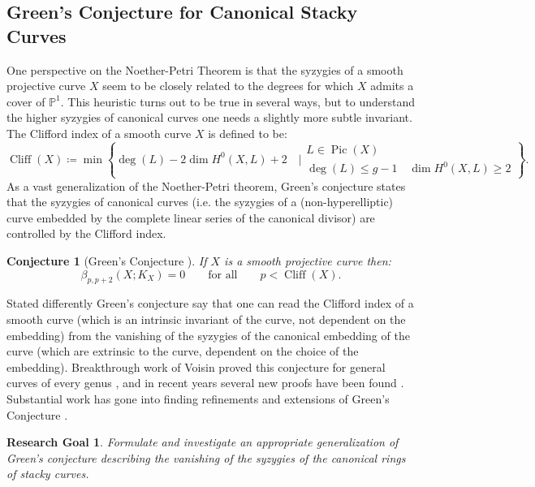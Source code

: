 \documentclass[11pt,reqno]{amsart}
\newtheorem{goal}[lemma]{Research Goal}
\newtheorem{conjecture}[lemma]{Conjecture}
\theoremstyle{remark}
\newcommand{\Pic}{\operatorname{Pic}}
\newcommand{\cliff}{\operatorname{Cliff}}
\newcommand{\PP}{\mathbb{P}}
\begin{document}
\subsection{Green's Conjecture for Canonical Stacky Curves} 

One perspective on the Noether-Petri Theorem is that the syzygies of a smooth projective curve $X$ seem to be closely related to the degrees for which $X$ admits a cover of $\PP^{1}$. This heuristic turns out to be true in several ways, but to understand the higher syzygies of canonical curves one needs a slightly more subtle invariant. The Clifford index of a smooth curve $X$ is defined to be:
 \[
\cliff(X)\coloneqq \min \left\{\deg(L) - 2 \dim H^{0}(X,L)+2 \quad \bigg| \begin{matrix} L\in \Pic(X) \\
\deg(L)\leq g-1 \quad \dim H^0(X,L)\geq2\end{matrix}\right\}.
\]
As a vast generalization of the Noether-Petri theorem, Green's conjecture states that the syzygies of canonical curves (i.e. the syzygies of a (non-hyperelliptic) curve embedded by the complete linear series of the canonical divisor) are controlled by the Clifford index.

\begin{conjecture}[Green's Conjecture \cite{green84-I}]
	If $X$ is a smooth projective curve then:
	\[
	\beta_{p,p+2}(X;K_X)=0 \quad \quad \text{for all} \quad \quad p<\cliff(X).
	\]
\end{conjecture}

Stated differently Green's conjecture say that one can read the Clifford index of a smooth curve (which is an intrinsic invariant of the curve, not dependent on the embedding) from the vanishing of the syzygies of the canonical embedding of the curve (which are extrinsic to the curve, dependent on the choice of the embedding). Breakthrough work of Voisin proved this conjecture for general curves of every genus \cite{voisin02,voisin05}, and in recent years several new proofs have been found \cite{aprodu19,kemeny21}. Substantial work has gone into finding refinements and extensions of Green's Conjecture \cite{farkasMustataPopa03,chiodoEFS13,farkasKemeny16,farkasKemeny17,deopurkar18,kemeny24}.


\begin{goal}\label{goal:stackyGreens}
Formulate and investigate an appropriate generalization of Green's conjecture describing the vanishing of the syzygies of the canonical rings of stacky curves. 
\end{goal}
\end{document}

